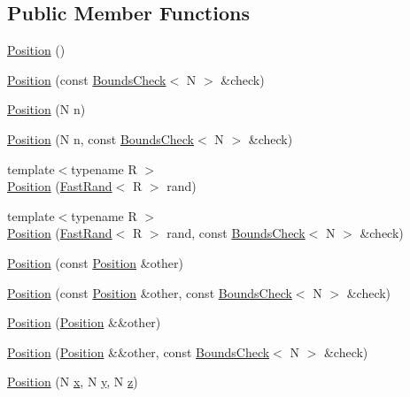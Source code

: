 \subsection*{Public Member Functions}
\begin{DoxyCompactItemize}
\item 
\hyperlink{struct_position_ae3a67f3e6f27a5594c181ca55d2b2ef3}{Position} ()
\item 
\hyperlink{struct_position_a82e58f222f30e32c322d77bf9a20352b}{Position} (const \hyperlink{struct_bounds_check}{Bounds\-Check}$<$ N $>$ \&check)
\item 
\hyperlink{struct_position_a01b903d664fb8ac74a9342116ce63287}{Position} (N n)
\item 
\hyperlink{struct_position_a14a1831fd5c139aef062778edc05397d}{Position} (N n, const \hyperlink{struct_bounds_check}{Bounds\-Check}$<$ N $>$ \&check)
\item 
{\footnotesize template$<$typename R $>$ }\\\hyperlink{struct_position_a5f4ebf0205cb9e52e6f78784ca34d733}{Position} (\hyperlink{class_fast_rand}{Fast\-Rand}$<$ R $>$ rand)
\item 
{\footnotesize template$<$typename R $>$ }\\\hyperlink{struct_position_aa7e02fe8aeff4147c31184d981813f9d}{Position} (\hyperlink{class_fast_rand}{Fast\-Rand}$<$ R $>$ rand, const \hyperlink{struct_bounds_check}{Bounds\-Check}$<$ N $>$ \&check)
\item 
\hyperlink{struct_position_a7b49db88251912bf531acec16719eb98}{Position} (const \hyperlink{struct_position}{Position} \&other)
\item 
\hyperlink{struct_position_adfe6dffd68cbf7f26945bfb1a307fa6c}{Position} (const \hyperlink{struct_position}{Position} \&other, const \hyperlink{struct_bounds_check}{Bounds\-Check}$<$ N $>$ \&check)
\item 
\hyperlink{struct_position_a370b6460b790eef270233cd7a3527721}{Position} (\hyperlink{struct_position}{Position} \&\&other)
\item 
\hyperlink{struct_position_a1072383b9a22b17759b55f897986f011}{Position} (\hyperlink{struct_position}{Position} \&\&other, const \hyperlink{struct_bounds_check}{Bounds\-Check}$<$ N $>$ \&check)
\item 
\hyperlink{struct_position_a410251ddeee4121896cac284e3d63de2}{Position} (N \hyperlink{struct_position_af908be922fc88d89d81be7d08d06f761}{x}, N \hyperlink{struct_position_af434f54a0aad8bbfc3806ebdd197aa3b}{y}, N \hyperlink{struct_position_ac430da98504c2d4fd685c0363d728474}{z})

\end{DoxyCompactItemize}
